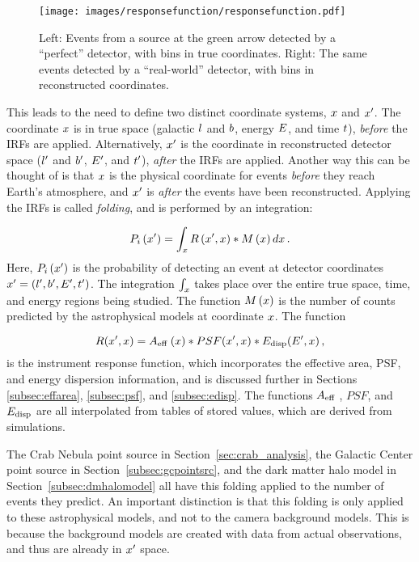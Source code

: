 \begin{figure}[!t]
  \centering
  \texttt{[image: images/responsefunction/responsefunction.pdf]}
  \caption[Response Function Dispersion]
  {
    Left: Events from a source at the green arrow detected by a ``perfect'' detector, with bins in true coordinates.
    Right: The same events detected by a ``real-world'' detector, with bins in reconstructed coordinates.
  }
  \label{fig:responsedispersion}
\end{figure}

This leads to the need to define two distinct coordinate systems, $x$ and $x'$.
The coordinate $x$ is in true space (galactic $l$ and $b$, energy $E$, and time $t$), \textit{before} the IRFs are applied.
Alternatively, $x'$ is the coordinate in reconstructed detector space ($l'$ and $b'$, $E'$, and $t'$), \textit{after} the IRFs are applied.
Another way this can be thought of is that $x$ is the physical coordinate for events \textit{before} they reach Earth's atmosphere, and $x'$ is \textit{after} the events have been reconstructed.
Applying the IRFs is called \textit{folding}, and is performed by an integration:

\begin{equation}\label{eqn:folding}
  P_i \left( x' \right ) = \int_x R \left ( x', x \right ) * M \left ( x \right ) dx \,.
\end{equation}
Here, $P_i \left( x' \right )$ is the probability of detecting an event at detector coordinates $x' = \left ( l', b', E', t' \right )$.
The integration $\int_x$ takes place over the entire true space, time, and energy regions being studied.
The function $M\left ( x \right )$ is the number of counts predicted by the astrophysical models at coordinate $x$.
The function

\begin{equation}\label{eqn:foldingR}
  R(x',x) = A_\textrm{eff }(x) * PSF(x',x) * E_\textrm{disp}(E',x) \,,
\end{equation}
is the instrument response function, which incorporates the effective area, PSF, and energy dispersion information, and is discussed further in Sections \ref{subsec:effarea}, \ref{subsec:psf}, and \ref{subsec:edisp}.
The functions $A_\textrm{eff }$, $PSF$, and $E_\textrm{disp}$ are all interpolated from tables of stored values, which are derived from simulations.

The Crab Nebula point source in Section~\ref{sec:crab_analysis}, the Galactic Center point source in Section~\ref{subsec:gcpointsrc}, and the dark matter halo model in Section~\ref{subsec:dmhalomodel} all have this folding applied to the number of events they predict.
An important distinction is that this folding is only applied to these astrophysical models, and not to the camera background models.
This is because the background models are created with data from actual observations, and thus are already in $x'$ space.


